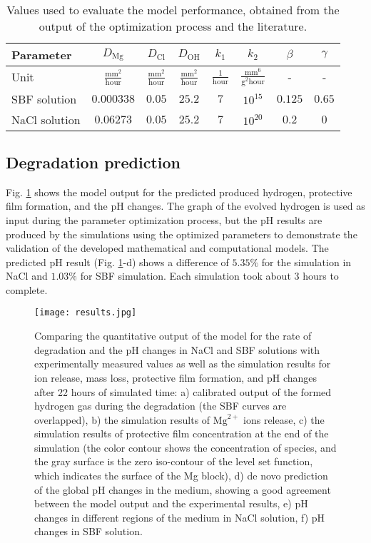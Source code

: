 \begin{table}[t]
\caption[Values used in the biodegradation model simulation performance]{Values used to evaluate the model performance, obtained from the output of the optimization process and the literature.}
\medskip
\centering
\begin{tabular}{lccccccc}
Parameter & $D_\mathrm{Mg}$ & $D_\mathrm{Cl}$ & $D_\mathrm{OH}$ & $k_1$ & $k_2$ & $\beta$ & $\gamma$ \\ \hline
Unit      & $\frac{\mathrm{mm}^2}{\mathrm{hour}}$ & $\frac{\mathrm{mm}^2}{\mathrm{hour}}$ & $\frac{\mathrm{mm}^2}{\mathrm{hour}}$ & $\frac{1}{\mathrm{hour}}$ & $\frac{\mathrm{mm}^6}{\mathrm{g}^2 \mathrm{hour}}$ & - & - \\ \hline
SBF solution       & $0.000338$ & $0.05$ & $25.2$ & $7$ & $10^{15}$ & $0.125$ & $0.65$  \\
NaCl solution      & $0.06273$ & $0.05$ & $25.2$ & $7$ & $10^{20}$ & $0.2$ & $0$
\end{tabular}
\label{tab:parameters}
\end{table}

\subsection{Degradation prediction}

Fig. \ref{fig:results} shows the model output for the predicted produced hydrogen, protective film formation, and the pH changes. The graph of the evolved hydrogen is used as input during the parameter optimization process, but the pH results are produced by the simulations using the optimized parameters to demonstrate the validation of the developed mathematical and computational models. The predicted pH result (Fig. \ref{fig:results}-d) shows a difference of $5.35 \%$ for the simulation in NaCl and $1.03 \%$ for SBF simulation. Each simulation took about 3 hours to complete.

\begin{figure}[t]
\centering
\medskip
\texttt{[image: results.jpg]}
\caption[Simulation results of the cuboid sample in the biodegradation test]{Comparing the quantitative output of the model for the rate of degradation and the pH changes in NaCl and SBF solutions with experimentally measured values as well as the simulation results for ion release, mass loss, protective film formation, and pH changes after 22 hours of simulated time: a) calibrated output of the formed hydrogen gas during the degradation (the SBF curves are overlapped), b) the simulation results of $\mathrm{Mg}^{2+}$ ions release, c) the simulation results of protective film concentration at the end of the simulation (the color contour shows the concentration of species, and the gray surface is the zero iso-contour of the level set function, which indicates the surface of the Mg block), d) de novo prediction of the global pH changes in the medium, showing a good agreement between the model output and the experimental results, e) pH changes in different regions of the medium in NaCl solution, f) pH changes in SBF solution.} \label{fig:results}
\end{figure}

